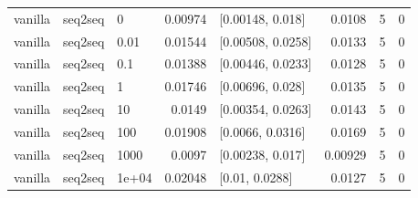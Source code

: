 \documentclass[10pt]{article}
\begin{document}
{\begin{longtable}{lllrlrrr}
vanilla & seq2seq & 0 & 0.00974 & [0.00148, 0.018] & 0.0108 & 5 & 0\\
vanilla & seq2seq & 0.01 & 0.01544 & [0.00508, 0.0258] & 0.0133 & 5 & 0\\
vanilla & seq2seq & 0.1 & 0.01388 & [0.00446, 0.0233] & 0.0128 & 5 & 0\\
vanilla & seq2seq & 1 & 0.01746 & [0.00696, 0.028] & 0.0135 & 5 & 0\\
vanilla & seq2seq & 10 & 0.0149 & [0.00354, 0.0263] & 0.0143 & 5 & 0\\
vanilla & seq2seq & 100 & 0.01908 & [0.0066, 0.0316] & 0.0169 & 5 & 0\\
vanilla & seq2seq & 1000 & 0.0097 & [0.00238, 0.017] & 0.00929 & 5 & 0\\
vanilla & seq2seq & 1e+04 & 0.02048 & [0.01, 0.0288] & 0.0127 & 5 & 0\\
\bottomrule
\end{longtable}
}
\end{document}
